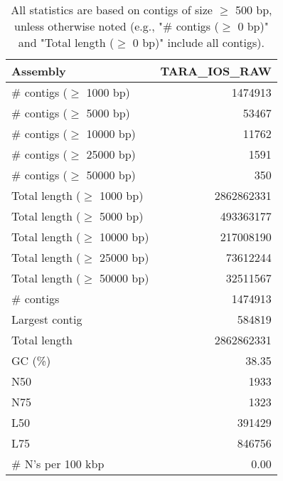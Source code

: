 \documentclass[12pt,a4paper]{article}
\begin{document}
\begin{table}[ht]
\begin{center}
\caption{All statistics are based on contigs of size $\geq$ 500 bp, unless otherwise noted (e.g., "\# contigs ($\geq$ 0 bp)" and "Total length ($\geq$ 0 bp)" include all contigs).}
\begin{tabular}{|l*{1}{|r}|}
\hline
Assembly & TARA\_IOS\_RAW \\ \hline
\# contigs ($\geq$ 1000 bp) & 1474913 \\ \hline
\# contigs ($\geq$ 5000 bp) & 53467 \\ \hline
\# contigs ($\geq$ 10000 bp) & 11762 \\ \hline
\# contigs ($\geq$ 25000 bp) & 1591 \\ \hline
\# contigs ($\geq$ 50000 bp) & 350 \\ \hline
Total length ($\geq$ 1000 bp) & 2862862331 \\ \hline
Total length ($\geq$ 5000 bp) & 493363177 \\ \hline
Total length ($\geq$ 10000 bp) & 217008190 \\ \hline
Total length ($\geq$ 25000 bp) & 73612244 \\ \hline
Total length ($\geq$ 50000 bp) & 32511567 \\ \hline
\# contigs & 1474913 \\ \hline
Largest contig & 584819 \\ \hline
Total length & 2862862331 \\ \hline
GC (\%) & 38.35 \\ \hline
N50 & 1933 \\ \hline
N75 & 1323 \\ \hline
L50 & 391429 \\ \hline
L75 & 846756 \\ \hline
\# N's per 100 kbp & 0.00 \\ \hline
\end{tabular}
\end{center}
\end{table}
\end{document}
